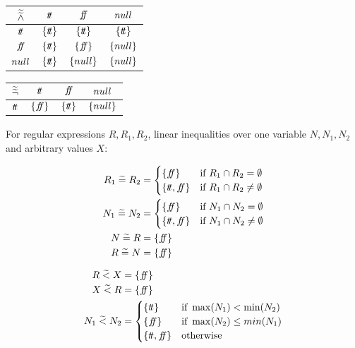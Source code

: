 \begin{table}[H]
    \centering
    \begin{tabular}{c|ccc}
        $\widetilde{\widetilde{\land}}$ & $t\!t$ & $f\!\!f$ & $null$ \\
        \hline
        $t\!t$ & $\{t\!t\}$ & $\{t\!t\}$ & $\{t\!t\}$ \\
        $f\!\!f$ & $\{t\!t\}$ & $\{f\!\!f\}$ & $\{null\}$ \\
        $null$ & $\{t\!t\}$ & $\{null\}$ & $\{null\}$ \\
    \end{tabular}
    \label{tab:aaabland}
\end{table}

\begin{table}[H]
    \centering
    \begin{tabular}{c|ccc}
        $\widetilde{\widetilde{\neg}}$ & $t\!t$ & $f\!\!f$ & $null$ \\
        \hline
        $t\!t$ & $\{f\!\!f\}$ & $\{t\!t\}$ & $\{null\}$ \\
    \end{tabular}
    \label{tab:aaabneg}
\end{table}

For regular expressions $R, R_1, R_2$, linear inequalities over one variable $N, N_1, N_2$ and arbitrary values $X$:

\begin{align}
    R_1 \;\aab{=}\; R_2 &= \begin{cases}
        \{\false\} & \text{if } R_1 \cap R_2 = \emptyset \\
        \{\true, \false\} & \text{if } R_1 \cap R_2 \neq \emptyset \\
    \end{cases} \\
    N_1 \;\aab{=}\; N_2 &= \begin{cases}
        \{\false\} & \text{if } N_1 \cap N_2 = \emptyset \\
        \{\true, \false\} & \text{if } N_1 \cap N_2 \neq \emptyset \\
    \end{cases} \\
    N \;\aab{=}\; R &= \{\false\} \\
    R \;\aab{=}\; N &= \{\false\} \\
\end{align}

\begin{align}
    R \;\aab{<}\; X &= \{\false\} \\
    X \;\aab{<}\; R &= \{\false\} \\
    N_1 \;\aab{<}\; N_2 &= \begin{cases}
        \{\true\} & \text{if } \max(N_1) < \min(N_2) \\
        \{\false\} & \text{if } \max(N_2) \leq min (N_1) \\
        \{\true, \false\} & \text{otherwise}
    \end{cases} \\
\end{align}

